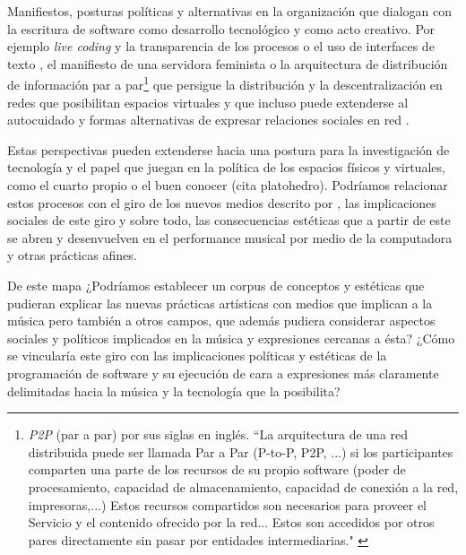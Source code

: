Manifiestos, posturas políticas y alternativas en la organización que dialogan con la escritura de software como desarrollo tecnológico y como acto creativo. Por ejemplo \textit{live coding} y la transparencia de los procesos o el uso de interfaces de texto \citep{collinsLivecoding}, el manifiesto de una servidora feminista \citep{feministserver} o la arquitectura de distribución de información par a par\footnote{\textit{P2P} (par a par) por sus siglas en inglés.  ``La arquitectura de una red distribuida puede ser llamada Par a Par (P-to-P, P2P, ...)   si los participantes comparten una parte de los recursos de su propio software (poder de procesamiento, capacidad de almacenamiento, capacidad de conexión a la red, impresoras,...) Estos recursos compartidos son necesarios para proveer el Servicio y el contenido ofrecido por la red... Estos son accedidos por otros pares directamente sin pasar por entidades intermediarias." \citep{p2p}} que persigue la distribución y la descentralización en redes que posibilitan espacios virtuales \citep{cyberspace} y que incluso puede extenderse al autocuidado y formas alternativas de expresar relaciones sociales en red \citep{dwc}. 

\color{black}

Estas perspectivas pueden extenderse hacia una postura para la investigación de tecnología y el papel que juegan en la política de los espacios físicos y virtuales, como el cuarto propio \citep{cuartopropio} o el buen conocer (cita platohedro). Podríamos relacionar estos procesos con el giro de los nuevos medios descrito por \cite{manovichlanguage}, las implicaciones sociales de este giro y sobre todo, las consecuencias estéticas que a partir de este se abren y desenvuelven en el performance musical por medio de la computadora y otras prácticas afines. 

\color{MidnightBlue}

De este mapa ¿Podríamos establecer un corpus de conceptos y estéticas \citep{shankenCanon} que pudieran explicar las nuevas prácticas artísticas con medios que implican a la música pero también a otros campos, que además pudiera considerar aspectos sociales y políticos implicados en la música y expresiones cercanas a ésta? ¿Cómo se vincularía este giro con las implicaciones políticas y estéticas de la programación de software y su ejecución \citep{speakingCode} de cara a expresiones más claramente delimitadas hacia la música y la tecnología que la posibilita?

\iffalse

- manifiestos y posturas políticas > live coding y servidora feminista 
- Diferencias con respecto a otros espacios
- Discusión sobre lo digital, los nuevos medios y la virtualidad. 
- Giro de los nuevos medios
- Agotamiento del formato
- funcionalidad - experimentación 
- Arqueología en internet (cosas que ya tienen tiempo y cosas recientes). 
- El papel de los videojuegos gamización
- Lo barroco y el artículo de electroacústica. 
- Espacio, arquitectura e integración: puede el espacio virtual convertirse en un objeto con agencia en la interpretacion en vivo? 

\fi

\color{black}
